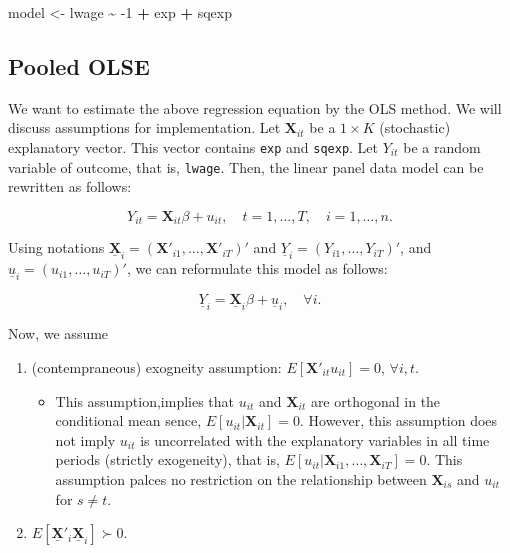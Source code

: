\documentclass[
  12pt,
]{article}
\newenvironment{Shaded}{\begin{snugshade}}{\end{snugshade}}
\newcommand{\DecValTok}[1]{\textcolor[rgb]{0.00,0.00,0.81}{#1}}
\newcommand{\NormalTok}[1]{#1}
\newcommand{\OperatorTok}[1]{\textcolor[rgb]{0.81,0.36,0.00}{\textbf{#1}}}
\newcommand{\StringTok}[1]{\textcolor[rgb]{0.31,0.60,0.02}{#1}}
\providecommand{\tightlist}{%
  \setlength{\itemsep}{0pt}\setlength{\parskip}{0pt}}
\begin{document}
\begin{Shaded}
\begin{Highlighting}[]
\NormalTok{model \textless{}{-}}\StringTok{ }\NormalTok{lwage }\OperatorTok{\textasciitilde{}}\StringTok{ }\DecValTok{{-}1} \OperatorTok{+}\StringTok{ }\NormalTok{exp }\OperatorTok{+}\StringTok{ }\NormalTok{sqexp}
\end{Highlighting}
\end{Shaded}

\hypertarget{pooled-olse}{%
\subsection{Pooled OLSE}\label{pooled-olse}}

We want to estimate the above regression equation by the OLS method. We
will discuss assumptions for implementation. Let \(\mathbf{X}_{it}\) be
a \(1 \times K\) (stochastic) explanatory vector. This vector contains
\texttt{exp} and \texttt{sqexp}. Let \(Y_{it}\) be a random variable of
outcome, that is, \texttt{lwage}. Then, the linear panel data model can
be rewritten as follows:

\[
  Y_{it} = \mathbf{X}_{it} \beta + u_{it}, \quad t = 1, \ldots, T, \quad i = 1, \ldots, n.
\]

Using notations
\(\underline{\mathbf{X}}_i = (\mathbf{X}'_{i1}, \ldots, \mathbf{X}'_{iT})'\)
and \(\underline{Y}_i = (Y_{i1}, \ldots, Y_{iT})'\), and
\(\underline{u}_i = (u_{i1}, \ldots, u_{iT})'\), we can reformulate this
model as follows:

\[
  \underline{Y}_i = \underline{\mathbf{X}}_i \beta + \underline{u}_i, \quad \forall i.
\]

Now, we assume

\begin{enumerate}
\def\labelenumi{\arabic{enumi}.}
\tightlist
\item
  (contempraneous) exogneity assumption:
  \(E[\mathbf{X}'_{it}u_{it}] = 0\), \(\forall i, t\).

  \begin{itemize}
  \tightlist
  \item
    This assumption,implies that \(u_{it}\) and \(\mathbf{X}_{it}\) are
    orthogonal in the conditional mean sence,
    \(E[u_{it} | \mathbf{X}_{it}] = 0\). However, this assumption does
    not imply \(u_{it}\) is uncorrelated with the explanatory variables
    in all time periods (strictly exogeneity), that is,
    \(E[u_{it} | \mathbf{X}_{i1}, \ldots, \mathbf{X}_{iT}] = 0\). This
    assumption palces no restriction on the relationship between
    \(\mathbf{X}_{is}\) and \(u_{it}\) for \(s\not=t\).
  \end{itemize}
\item
  \(E[\underline{\mathbf{X}}'_i\underline{\mathbf{X}}_i] \succ 0\).
\end{enumerate}
\end{document}
